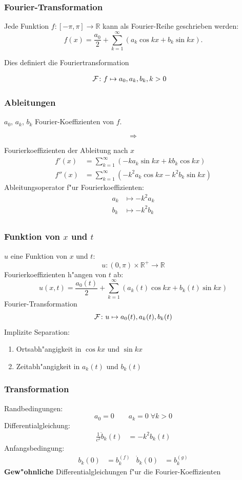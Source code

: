 \begin{frame}
\frametitle{Fourier-Transformation}

Jede Funktion $f\colon [-\pi,\pi]\to\mathbb R$ kann als Fourier-Reihe
geschrieben werden:
\[
f(x)=\frac{a_0}{2}+\sum_{k=1}^\infty(a_k\cos kx+b_k\sin kx).
\]

\medskip
\pause
Dies definiert die Fouriertransformation
\medskip

\begin{align*}
{\cal F}\colon
f
&\mapsto
a_0, a_k, b_k, k> 0
\end{align*}

\end{frame}

\begin{frame}
\frametitle{Ableitungen}
$a_0$, $a_k$, $b_k$ Fourier-Koeffizienten von $f$.

\[\Rightarrow\]

Fourierkoeffizienten der Ableitung nach $x$
\begin{align*}
f'(x)&=\sum_{k=1}^\infty (-ka_k\sin kx+kb_k\cos kx)\\
f''(x)&=\sum_{k=1}^\infty (-k^2a_k\cos kx-k^2b_k\sin kx)
\end{align*}
Ableitungsoperator f"ur Fourierkoeffizienten:
\begin{align*}
a_k&\mapsto -k^2a_k\\
b_k&\mapsto -k^2b_k\\
\end{align*}
\end{frame}

\begin{frame}
\frametitle{Funktion von $x$ und $t$}

$u$ eine Funktion von $x$ und $t$:
\[
u\colon (0,\pi)\times \mathbb R^+\to \mathbb R
\]
Fourierkoeffizienten h"angen von $t$ ab:
\[
u(x,t)=\frac{a_0(t)}2+\sum_{k=1}^\infty (a_k(t)\cos kx+b_k(t)\sin kx)
\]
Fourier-Transformation
\[
{\cal F}\colon
u\mapsto
a_0(t), a_k(t), b_k(t)
\]
\pause
Implizite Separation:
\begin{enumerate}[<+->]
\item Ortsabh"angigkeit in $\cos kx$ und $\sin kx$
\item Zeitabh"angigkeit in $a_k(t)$ und $b_k(t)$
\end{enumerate}

\end{frame}

\begin{frame}
\frametitle{Transformation}
Randbedingungen:
\[
a_0=0\qquad
a_k=0\;\forall k > 0
\]
Differentialgleichung:
\begin{align*}
\frac{1}{c^2}\ddot b_k(t)&= -k^2b_k(t)
\end{align*}
Anfangsbedingung:
\begin{align*}
b_k(0)&= b_k^{(f)}& \dot b_k(0)&=b_k^{(g)}
\end{align*}
{\bf Gew"ohnliche} Differentialgleichungen f"ur die Fourier-Koeffizienten
\end{frame}

